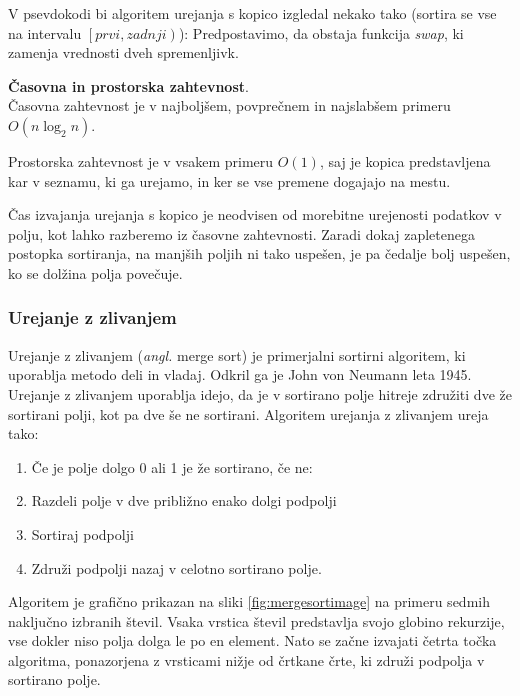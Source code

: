 \documentclass[a4paper,oneside]{article}
\begin{document}
V psevdokodi bi algoritem urejanja s kopico izgledal nekako tako (sortira se vse na intervalu
$\left[prvi, zadnji\right)$):
Predpostavimo, da obstaja funkcija \emph{swap}, ki zamenja vrednosti dveh spremenljivk.




\textbf{Časovna in prostorska zahtevnost}. \\
Časovna zahtevnost je v najboljšem, povprečnem in najslabšem primeru $O(n\log_2 n)$.

Prostorska zahtevnost je v vsakem primeru $O(1)$, saj je kopica predstavljena kar v
seznamu, ki ga urejamo, in ker se vse premene dogajajo na mestu.

Čas izvajanja urejanja s kopico je neodvisen od morebitne urejenosti podatkov v polju,
kot lahko razberemo iz časovne zahtevnosti. Zaradi dokaj zapletenega postopka sortiranja,
na manjših poljih ni tako uspešen, je pa čedalje bolj uspešen, ko se dolžina polja
povečuje.

\subsubsection{Urejanje z zlivanjem}
\label{chapter:mergesort}
Urejanje z zlivanjem (\emph{angl.} merge sort) je primerjalni sortirni algoritem, ki
uporablja metodo deli in vladaj. Odkril ga je John von Neumann leta 1945.
Urejanje z zlivanjem uporablja idejo, da je v sortirano polje hitreje združiti dve že
sortirani polji, kot pa dve še ne sortirani. 
Algoritem urejanja z zlivanjem ureja tako:
\begin{enumerate}
  \item Če je polje dolgo 0 ali 1 je že sortirano, če ne:
  \item Razdeli polje v dve približno enako dolgi podpolji
  \item Sortiraj podpolji 
  \item Združi podpolji nazaj v celotno sortirano polje.
\end{enumerate}

Algoritem je grafično prikazan na sliki \ref{fig:mergesortimage} na primeru sedmih
naključno izbranih števil.
Vsaka vrstica števil predstavlja svojo globino rekurzije, vse dokler niso polja dolga le
po en element. Nato se začne izvajati četrta točka algoritma, ponazorjena z vrsticami
nižje od črtkane črte, ki združi podpolja v sortirano polje.
\end{document}
